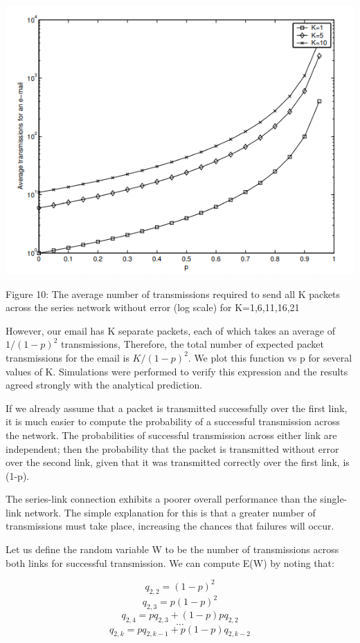 \documentclass[10pt,twocolumn,letterpaper]{article}
\begin{document}
\includegraphics[width=\linewidth]{plots/fig10.PNG}
\caption{Figure 10: The average number of transmissions required to send all K packets across the series network without error (log scale) for K=1,6,11,16,21}


However, our email has K separate packets, each of which takes an average of $1/(1-p)^2$ transmissions, Therefore, the total number of expected packet transmissions for the email is $K/(1-p)^2$. We plot this function vs p for several values of K. Simulations were performed to verify this expression and the results agreed strongly with the analytical prediction. 

If we already assume that a packet is transmitted successfully over the first link, it is much easier to compute the probability of a successful transmission across the network. The probabilities of successful transmission across either link are independent; then the probability that the packet is transmitted without error over the second link, given that it was transmitted correctly over the first link, is (1-p).

The series-link connection exhibits a poorer overall performance than the single-link network. The simple explanation for this is that a greater number of transmissions must take place, increasing the chances that failures will occur.

Let us define the random variable W to be the number of transmissions across both links for successful transmission. We can compute E(W) by noting that:

$$ q_{2,2} = (1-p)^2 $$
$$ q_{2,3} = p(1-p)^2 $$
$$ q_{2,4} = p q_{2,3} + (1-p) p q_{2,2} $$
$$ ... $$
$$ q_{2,k} = p q_{2,k-1} + p (1-p) q_{2,k-2} $$
\end{document}
